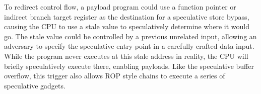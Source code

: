 To redirect control flow, a payload program could use a function pointer or
indirect branch target register as the destination for a speculative store
bypass, causing the CPU to use a stale value to speculatively determine where it
would go. The stale value could be controlled by a previous unrelated input,
allowing an adversary to specify the speculative entry point in a carefully
crafted data input. While the program never
executes at this stale address in reality, the CPU will briefly speculatively
execute there, enabling \speculake payloads. Like the speculative buffer
overflow, this trigger also allows ROP style chains to execute a series of
speculative gadgets.





%
%
%

